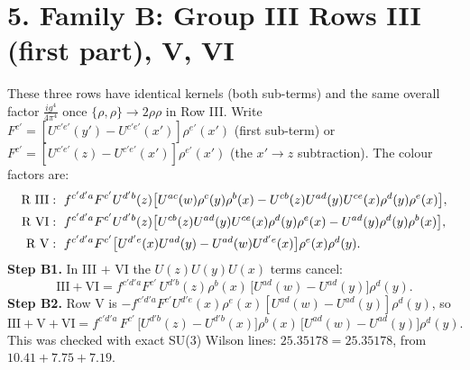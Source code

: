 \documentclass[10pt]{article}
\begin{document}
\section*{5. Family B: Group III Rows III (first part), V, VI}
These three rows have identical kernels (both sub-terms) and the same overall factor $\frac{ig^{4}}{4\pi^{4}}$ once $\{\rho,\rho\}\to2\rho\rho$ in Row III. Write $F^{c'}=[U^{c'e'}(y')-U^{c'e'}(x')]\rho^{e'}(x')$ (first sub-term) or $F^{c'}=[U^{c'e'}(z)-U^{c'e'}(x')]\rho^{e'}(x')$ (the $x'\to z$ subtraction). The colour factors are:
\begin{align}
\text{R III}&:\ f^{c'd'a}F^{c'}U^{d'b}(z)\big[U^{ac}(w)\rho^{c}(y)\rho^{b}(x)-U^{cb}(z)U^{ad}(y)U^{ce}(x)\rho^{d}(y)\rho^{e}(x)\big],\notag\\
\text{R VI}&:\ f^{c'd'a}F^{c'}U^{d'b}(z)\big[U^{cb}(z)U^{ad}(y)U^{ce}(x)\rho^{d}(y)\rho^{e}(x)-U^{ad}(y)\rho^{d}(y)\rho^{b}(x)\big],\notag\\
\text{R V}&:\ f^{c'd'a}F^{c'}\big[U^{d'e}(x)U^{ad}(y)-U^{ad}(w)U^{d'e}(x)\big]\rho^{e}(x)\rho^{d}(y).
\end{align}
\textbf{Step B1.} In III $+$ VI the $U(z)U(y)U(x)$ terms cancel:
\begin{equation}
\text{III}+\text{VI}=f^{c'd'a}F^{c'}\,U^{d'b}(z)\rho^{b}(x)\,\big[U^{ad}(w)-U^{ad}(y)\big]\rho^{d}(y).
\end{equation}
\textbf{Step B2.} Row V is $-f^{c'd'a}F^{c'}U^{d'e}(x)\rho^{e}(x)[U^{ad}(w)-U^{ad}(y)]\rho^{d}(y)$, so
\begin{equation}
\text{III}+\text{V}+\text{VI}=f^{c'd'a}\,F^{c'}\,\big[U^{d'b}(z)-U^{d'b}(x)\big]\rho^{b}(x)\,\big[U^{ad}(w)-U^{ad}(y)\big]\rho^{d}(y).
\end{equation}
This was checked with exact SU(3) Wilson lines: $25.35178=25.35178$, from $10.41+7.75+7.19$.
\end{document}
